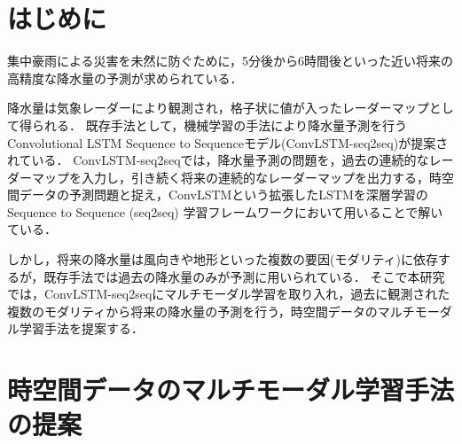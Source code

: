 \documentclass[a4j,twoside]{jarticle}
\begin{document}
\twocolumn[\vspace*{9mm}]	%
\begin{論文概要}				%
\setcounter{page}{1}		%
\section{はじめに}
%
集中豪雨による災害を未然に防ぐために，5分後から6時間後といった近い将来の高精度な降水量の予測が求められている．

降水量は気象レーダーにより観測され，格子状に値が入ったレーダーマップとして得られる．
既存手法として，機械学習の手法により降水量予測を行う{\small Convolutional LSTM Sequence to Sequence}モデル(ConvLSTM-seq2seq)が提案されている\cite{shi2015convolutional}．
ConvLSTM-seq2seqでは，降水量予測の問題を，過去の連続的なレーダーマップを入力し，引き続く将来の連続的なレーダーマップを出力する，時空間データの予測問題と捉え，ConvLSTMという拡張したLSTMを深層学習のSequence to Sequence (seq2seq) 学習フレームワークにおいて用いることで解いている．

しかし，将来の降水量は風向きや地形といった複数の要因(モダリティ)に依存するが，既存手法では過去の降水量のみが予測に用いられている．
そこで本研究では，ConvLSTM-seq2seqにマルチモーダル学習を取り入れ，過去に観測された複数のモダリティから将来の降水量の予測を行う，時空間データのマルチモーダル学習手法を提案する．

%
\section{{\normalsize 時空間データのマルチモーダル学習手法の提案}}
\label{model:chapter}
%

\end{論文概要}
\end{document}
